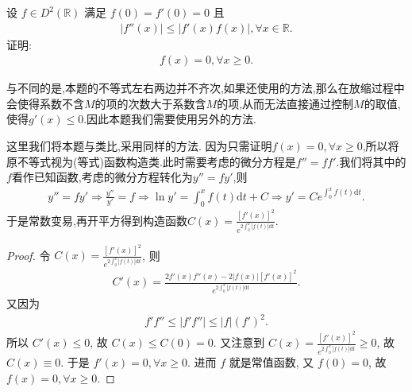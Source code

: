 \documentclass[../../main.tex]{subfiles}%
\begin{document}
\begin{example}
设 $f\in D^2(\mathbb{R})$ 满足 $f(0)=f'(0)=0$ 且
\begin{align*}
|f''(x)|\leqslant|f'(x)f(x)|,\forall x\in\mathbb{R}.
\end{align*}
证明:
\begin{align*}
f(x)=0,\forall x\geqslant 0.
\end{align*} 
\end{example}
\begin{remark}
与不同的是,本题的不等式左右两边并不齐次,如果还使用的方法,那么在放缩过程中会使得系数不含$M$的项的次数大于系数含$M$的项,从而无法直接通过控制$M$的取值,使得$g'(x)\leqslant 0$.因此本题我们需要使用另外的方法.

这里我们将本题与类比,采用同样的方法. 因为只需证明$f(x)=0,\forall x\geqslant 0$,所以将原不等式视为(等式)函数构造类.此时需要考虑的微分方程是$f''=ff'$.我们将其中的$f$看作已知函数,考虑的微分方程转化为$y''=fy'$,则
\begin{align*}
y'' =fy' \Rightarrow \frac{y''}{y'}=f\Rightarrow \ln y' =\int_0^x{f\left( t \right) \mathrm{d}t}+C\Rightarrow y' =Ce^{\int_0^x{f\left( t \right) \mathrm{d}t}}.
\end{align*}
于是常数变易,再开平方得到构造函数$C\left( x \right) =\frac{\left[ f'\left( x \right) \right] ^2}{e^{2\int_0^x{|f\left( t \right)| \mathrm{d}t}}}.$
\end{remark}
\begin{proof}

令 $C(x)=\frac{[f'(x)]^2}{e^{2\int_0^x{|f(t)|\mathrm{d}t}}}$, 则
\begin{align*}
C'(x)=\frac{2f'(x)f''(x)-2|f(x)|[f'(x)]^2}{e^{2\int_0^x{|f(t)|\mathrm{d}t}}}.
\end{align*}
又因为
\begin{align*}
f'f''\leqslant|f'f''|\leqslant|f|(f')^2.
\end{align*}
所以 $C'(x)\leqslant0$, 故 $C(x)\leqslant C(0)=0$. 又注意到 $C(x)=\frac{[f'(x)]^2}{e^{2\int_0^x{|f(t)|\mathrm{d}t}}}\geqslant0$, 故 $C(x)\equiv0$. 于是 $f'(x)=0,\forall x\geqslant0$.
进而 $f$ 就是常值函数, 又 $f(0)=0$, 故 $f(x)=0,\forall x\geqslant0$. 

\end{proof}
\end{document}

